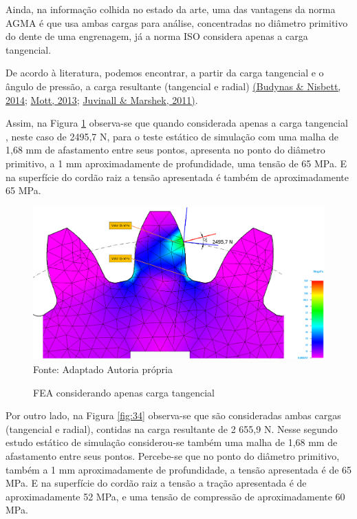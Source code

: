 \documentclass[12pt,a4paper]{article}
\begin{document}
Ainda, na informação colhida no estado da arte, uma das vantagens da
norma AGMA é que usa ambas cargas para análise, concentradas no diâmetro
primitivo do dente de uma engrenagem, já a norma ISO considera apenas a
carga tangencial.

De acordo à literatura, podemos encontrar, a partir da carga tangencial
e o ângulo de pressão, a carga resultante (tangencial e radial)
\hyperref[csl:20]{(Budynas \& Nisbett, 2014}; \hyperref[csl:21]{Mott, 2013}; \hyperref[csl:27]{Juvinall \& Marshek, 2011)}.

Assim, na Figura {\ref{fig:33}} observa-se que quando
considerada apenas a carga tangencial , neste caso de 2495,7 N, para o
teste estático de simulação com uma malha de 1,68 mm de afastamento
entre seus pontos, apresenta no ponto do diâmetro primitivo, a 1 mm
aproximadamente de profundidade, uma tensão de 65 MPa. E na superfície
do cordão raiz a tensão apresentada é também de aproximadamente 65 MPa.

\begin{figure}[!htb]
    \centering
    \caption{FEA considerando apenas carga tangencial}
    \includegraphics[scale=0.46]{Imagens/Img33.png}\\
    {\footnotesize Fonte: Adaptado  Autoria própria}
    \label{fig:33}
\end{figure}

Por outro lado, na Figura {\ref{fig:34}} observa-se que
são consideradas ambas cargas (tangencial e radial), contidas na carga
resultante de 2 655,9 N. Nesse segundo estudo estático de simulação
considerou-se também uma malha de 1,68 mm de afastamento entre seus
pontos. Percebe-se que no ponto do diâmetro primitivo, também a 1 mm
aproximadamente de profundidade, a tensão apresentada é de 65 MPa. E na
superfície do cordão raiz a tensão a tração apresentada é de
aproximadamente 52 MPa, e uma tensão de compressão de aproximadamente 60
MPa.
\end{document}
